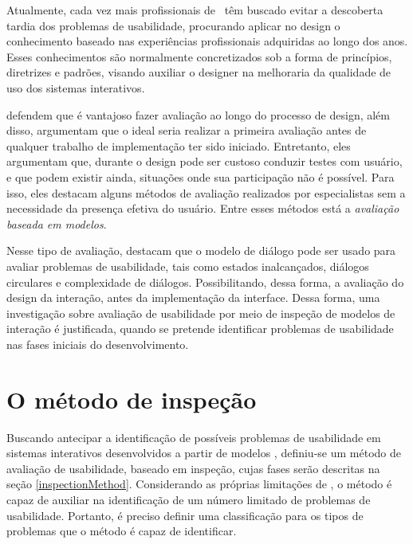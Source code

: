 Atualmente, cada vez mais profissionais  de \ihc\ têm buscado evitar a
descoberta tardia dos problemas  de usabilidade, procurando aplicar no
design   o  conhecimento   baseado   nas  experiências   profissionais
adquiridas  ao longo  dos anos.   Esses conhecimentos  são normalmente
concretizados sob a forma de princípios, diretrizes e padrões, visando
auxiliar o  designer na  melhoraria da qualidade  de uso  dos sistemas
interativos.

  defendem  que  é  vantajoso  fazer
avaliação ao longo do processo de design, além disso, argumentam que o
ideal seria  realizar a primeira avaliação antes  de qualquer trabalho
de implementação ter sido  iniciado.  Entretanto, eles argumentam que,
durante o design  pode ser custoso conduzir testes  com usuário, e que
podem existir  ainda, situações onde sua participação  não é possível.
Para isso,  eles destacam alguns  métodos de avaliação  realizados por
especialistas sem a necessidade da presença efetiva do usuário.  Entre
esses métodos está a {\em avaliação baseada em modelos}.

Nesse  tipo de avaliação,   destacam
que  o modelo  de diálogo  pode ser  usado para  avaliar  problemas de
usabilidade,  tais como  estados inalcançados,  diálogos  circulares e
complexidade de diálogos.  Possibilitando, dessa forma, a avaliação do
design  da  interação, antes  da  implementação  da interface.   Dessa
forma,  uma investigação sobre  avaliação de  usabilidade por  meio de
inspeção  de modelos de  interação é  justificada, quando  se pretende
identificar   problemas   de  usabilidade   nas   fases  iniciais   do
desenvolvimento.

\section{O método de inspeção \aladim}
\label{aladimInspection}

Buscando   antecipar  a  identificação   de  possíveis   problemas  de
usabilidade em sistemas interativos  desenvolvidos a partir de modelos
\aladim, definiu-se um método  de avaliação de usabilidade, baseado em
inspeção, cujas fases serão descritas na seção \ref{inspectionMethod}.
Considerando as  próprias limitações de  \aladim, o método é  capaz de
auxiliar  na  identificação de  um  número  limitado  de problemas  de
usabilidade.  Portanto,  é preciso  definir uma classificação  para os
tipos de problemas que o método é capaz de identificar.

